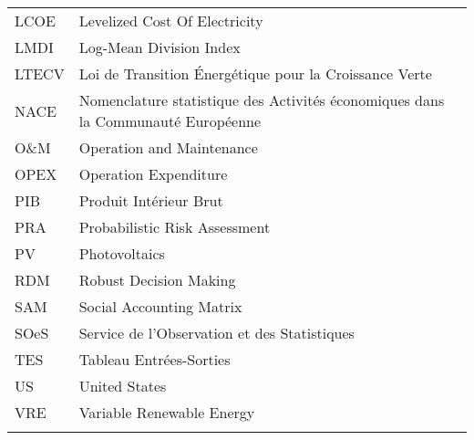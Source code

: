 \begin{tabular}{ p{} p{} }

LCOE & Levelized Cost Of Electricity \\
LMDI & Log-Mean Division Index  \\
LTECV & Loi de Transition Énergétique pour la Croissance Verte \\
NACE & Nomenclature statistique des Activités économiques dans la Communauté Européenne \\
O\&M & Operation and Maintenance \\
OPEX & Operation Expenditure \\
PIB & Produit Intérieur Brut  \\
PRA & Probabilistic Risk Assessment \\
PV & Photovoltaics \\
RDM & Robust Decision Making  \\
SAM & Social Accounting Matrix \\
SOeS & Service de l'Observation et des Statistiques \\
TES & Tableau Entrées-Sorties \\
US & United States \\
VRE & Variable Renewable Energy \\

\tabularnewline
\end{tabular}
